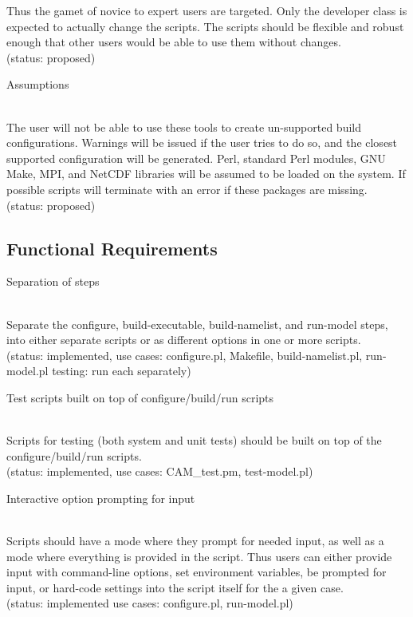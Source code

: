 \documentclass[]{article}
\begin{document}
\begin{enumerate}
\begin{itemize}
\end{itemize}
Thus the gamet of novice to expert users are targeted. Only the developer class is
expected to actually change the scripts. The scripts should be flexible and robust
enough that other users would be able to use them without changes.
\\
(status: proposed)

{\bf\em \item Assumptions}\\
The user will not be able to use these tools to create un-supported build configurations.
Warnings will be issued if the user tries to do so, and the closest supported configuration 
will be generated. Perl, standard Perl modules, GNU Make, MPI, and NetCDF libraries will 
be assumed to be loaded on the system. If possible scripts will terminate with an error
if these packages are missing.
\\
(status: proposed)

\subsection{Functional Requirements}

{\bf\em \item Separation of steps}\\
Separate the configure, build-executable, build-namelist, and run-model steps, into
either separate scripts or as different options in one or more scripts. \\
(status: implemented,
use cases: configure.pl, Makefile, build-namelist.pl, run-model.pl testing: run each 
separately)

{\bf\em \item Test scripts built on top of configure/build/run scripts}\\
Scripts for testing (both system and unit tests) should be built on top of the 
configure/build/run scripts. \\
(status: implemented, use cases: CAM\_test.pm, test-model.pl)

{\bf\em \item Interactive option prompting for input}\\
Scripts should have a mode where they prompt for needed input, as well
as a mode where everything is provided in the script. Thus users can either provide
input with command-line options, set environment variables, be prompted for input,
or hard-code settings into the script itself for the a given case.\\
(status: implemented use cases: configure.pl, run-model.pl)


\end{enumerate}
\end{document}
